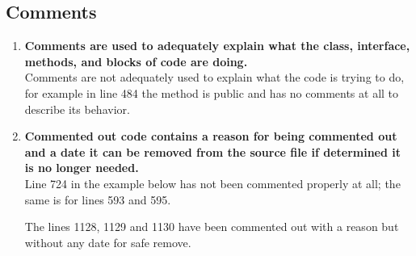\documentclass[a4paper,11pt]{report} %
\begin{document}
		\subsection*{Comments}\begin{enumerate}[resume]
			\item \textbf{Comments are used to adequately explain what the class, interface, methods, and blocks of code are doing.}\smallskip \\
				Comments are not adequately used to explain what the code is trying to do, for example in line 484 the method is public and has no comments at all to describe its behavior.
				
			\item \textbf{Commented out code contains a reason for being commented out and a date it can be removed from the source file if determined it is no longer needed.}\smallskip \\
				Line 724 in the example below has not been commented properly at all; the same is for lines 593 and 595.
				
				The lines 1128, 1129 and 1130 have been commented out with a reason but without any date for safe remove.
				

		\end{enumerate}
		
\end{document}
